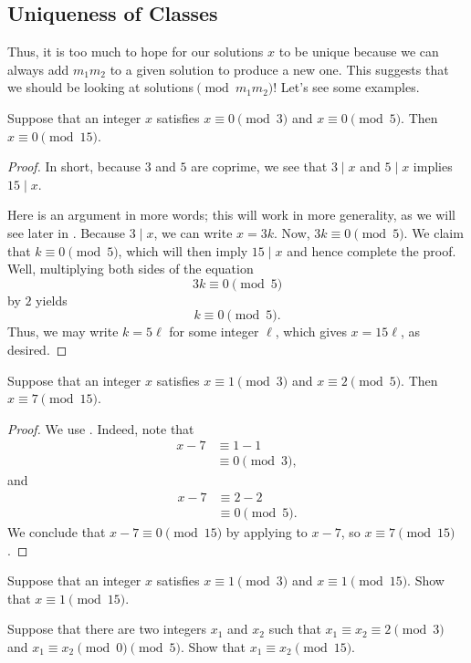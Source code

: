 \documentclass{article}
\begin{document}
\subsection{Uniqueness of Classes}
Thus, it is too much to hope for our solutions $x$ to be unique because we can always add $m_1m_2$ to a given solution to produce a new one. This suggests that we should be looking at solutions$\pmod{m_1m_2}$! Let's see some examples.
\begin{example} \label{ex:crt-uniq-mod-3-mod-5}
	Suppose that an integer $x$ satisfies $x\equiv0\pmod3$ and $x\equiv0\pmod5$. Then $x\equiv0\pmod{15}$.
\end{example}
\begin{proof}
	In short, because $3$ and $5$ are coprime, we see that $3\mid x$ and $5\mid x$ implies $15\mid x$.

	Here is an argument in more words; this will work in more generality, as we will see later in . Because $3\mid x$, we can write $x=3k$. Now, $3k\equiv0\pmod5$. We claim that $k\equiv0\pmod5$, which will then imply $15\mid x$ and hence complete the proof. Well, multiplying both sides of the equation
	\[3k\equiv0\pmod5\]
	by $2$ yields
	\[k\equiv0\pmod5.\]
	Thus, we may write $k=5\ell$ for some integer $\ell$, which gives $x=15\ell$, as desired.
\end{proof}
\begin{example} \label{ex:crt-uniq-mod-3-mod-5-nonzero}
	Suppose that an integer $x$ satisfies $x\equiv1\pmod3$ and $x\equiv2\pmod5$. Then $x\equiv7\pmod{15}$.
\end{example}
\begin{proof}
	We use . Indeed, note that
	\begin{align*}
		x-7 &\equiv 1-1 \\
		&\equiv0\pmod3,
	\end{align*}
	and
	\begin{align*}
		x-7 &\equiv 2-2 \\
		&\equiv 0\pmod5.
	\end{align*}
	We conclude that $x-7\equiv0\pmod{15}$ by applying  to $x-7$, so $x\equiv7\pmod{15}$.
\end{proof}
\begin{exe}
	Suppose that an integer $x$ satisfies $x\equiv1\pmod3$ and $x\equiv1\pmod{15}$. Show that $x\equiv1\pmod{15}$.
\end{exe}
\begin{exe}
	Suppose that there are two integers $x_1$ and $x_2$ such that $x_1\equiv x_2\equiv2\pmod{3}$ and $x_1\equiv x_2\pmod0\pmod5$. Show that $x_1\equiv x_2\pmod{15}$.
\end{exe}
\end{document}
